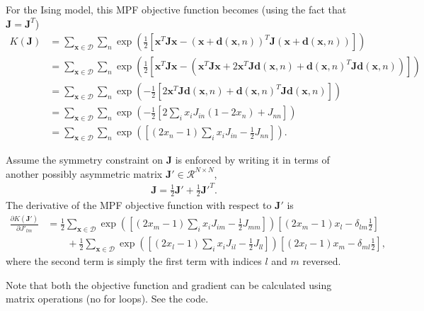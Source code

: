 \documentclass{article}
\newcommand{\pd}[2]{\frac{\partial #1}{\partial #2}}
\newcommand{\mb}{\mathbf}
\begin{document}
For the Ising model, this MPF objective function becomes (using the fact that $\mb J = \mb J^T$)
\begin{align}
K\left( \mb J \right) & = \sum_{\mb x \in \mathcal D} \sum_n \exp\left( \frac{1}{2}\left[
\mb x^T \mb J \mb x
- (\mb x + {\mb d}(\mb x, n))^T \mb J (\mb x + {\mb d}(\mb x, n))
\right] \right) \\
& = \sum_{\mb x \in \mathcal D} \sum_n \exp\left( \frac{1}{2}\left[
\mb x^T \mb J \mb x
- \left(
\mb x^T \mb J \mb x
+
2 \mb x^T \mb J {\mb d}(\mb x, n)
+
{\mb d}(\mb x, n)^T \mb J {\mb d}(\mb x, n)
\right) 
\right] \right)
 \\
& = \sum_{\mb x \in \mathcal D} \sum_n \exp\left( -\frac{1}{2}\left[
2 \mb x^T \mb J {\mb d}(\mb x, n)
+
{\mb d}(\mb x, n)^T \mb J {\mb d}(\mb x, n)
\right]
\right)  \\
& = \sum_{\mb x \in \mathcal D} \sum_n \exp\left( -\frac{1}{2}\left[
2 \sum_i x_i J_{in} \left( 1 - 2 x_n  \right)
+
J_{nn}
\right]
\right)\\
& = \sum_{\mb x \in \mathcal D} \sum_n \exp\left( \left[
\left( 2 x_n - 1 \right) \sum_i x_i J_{in}
-
\frac{1}{2}J_{nn}
\right]
\right)
\label{K final single bit}
.
\end{align}

Assume the symmetry constraint on $\mb J$ is enforced by writing it in terms of another possibly asymmetric matrix $\mb J' \in \mathcal R^{N\times N}$,
\begin{align}
\mb J = \frac{1}{2} \mb J' + \frac{1}{2} \mb {J'}^T
.
\end{align}
The derivative of the MPF objective function with respect to $\mb J'$ is
\begin{align}
\pd{K\left( \mb J' \right)}{{J'}_{lm}}  & =
\frac{1}{2}\sum_{\mb x \in \mathcal D} \exp\left( \left[
\left( 2 x_m - 1 \right) \sum_i x_i {J}_{im}
-
\frac{1}{2}{J}_{mm}
\right]
\right)
	\left[
		\left( 2 x_m - 1 \right) x_l
		-
		\delta_{lm} \frac{1}{2}
	\right] \nonumber \\ & \qquad 
+
\frac{1}{2}\sum_{\mb x \in \mathcal D} \exp\left( \left[
\left( 2 x_l - 1 \right) \sum_i x_i {J}_{il}
-
\frac{1}{2}{J}_{ll}
\right]
\right)
	\left[
		\left( 2 x_l - 1 \right) x_m
		-
		\delta_{ml} \frac{1}{2}
	\right]
,
\end{align}
where the second term is simply the first term with indices $l$ and $m$ reversed.

Note that both the objective function and gradient can be calculated using matrix operations (no for loops).  See the code.
\end{document}

